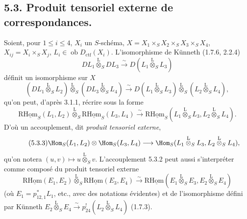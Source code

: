 \subsection*{5.3. Produit tensoriel externe de correspondances.}

Soient, pour $1\leq i\leq 4$, $X_i$ un $S$-schéma, $X=X_1\times_SX_2\times_SX_3\times_SX_4$, $X_{ij}=X_i\times_SX_j$, $L_i\in\operatorname{ob}D_{\mathrm{ctf}}(X_i)$. L'isomorphisme de Künneth (1.7.6, 2.2.4)
\[
DL_1\overset{\mathrm{L}}{\otimes}_SDL_3\xrightarrow{\sim}D(L_1\overset{\mathrm{L}}{\otimes}_SL_3)
\]
définit un isomorphisme sur $X$
\begin{equation}
\tag{5.3.1}
(DL_1\overset{\mathrm{L}}{\otimes}_SL_2)\overset{\mathrm{L}}{\otimes}_S(DL_3\overset{\mathrm{L}}{\otimes}_SL_4)
\xrightarrow{\sim}D(L_1\overset{\mathrm{L}}{\otimes}_SL_3)\overset{\mathrm{L}}{\otimes}_S(L_2\overset{\mathrm{L}}{\otimes}_SL_4),
\end{equation}
qu'on peut, d'après 3.1.1, récrire sous la forme
\begin{equation}
\tag{5.3.2}
\mathrm{R}\underline{\mathrm{Hom}}_S(L_1,L_2)\overset{\mathrm{L}}{\otimes}_S\mathrm{R}\underline{\mathrm{Hom}}_S(L_3,L_4)
\xrightarrow{\sim}\mathrm{R}\underline{\mathrm{Hom}}_S(L_1\overset{\mathrm{L}}{\otimes}_SL_3,L_2\overset{\mathrm{L}}{\otimes}_SL_4).
\end{equation}
D'où un accouplement, dit \emph{produit tensoriel externe},
\begin{equation}
\tag{5.3.3}
\Hom_S(L_1,L_2)\otimes\Hom_S(L_3,L_4)
\longrightarrow\Hom_S(L_1\overset{\mathrm{L}}{\otimes}_SL_3,L_2\overset{\mathrm{L}}{\otimes}_SL_4),
\end{equation}
qu'on notera $(u,v)\mapsto u\overset{\mathrm{L}}{\otimes}_Sv$. L'accouplement 5.3.2 peut aussi s'interpréter comme composé du produit tensoriel externe
\[
\mathrm{R}\underline{\mathrm{Hom}}(E_1,E_2)\overset{\mathrm{L}}{\otimes}_S\mathrm{R}\underline{\mathrm{Hom}}(E_3,E_4)
\xrightarrow{\sim}\mathrm{R}\underline{\mathrm{Hom}}(E_1\overset{\mathrm{L}}{\otimes}_SE_3,E_2\overset{\mathrm{L}}{\otimes}_SE_4)
\]
(où $E_1=p_{12,1}^*L_1$, etc., avec des notations évidentes) et de l'isomorphisme défini par Künneth $E_2\overset{\mathrm{L}}{\otimes}_SE_4\xrightarrow{\sim}p_{24}^!(L_2\overset{\mathrm{L}}{\otimes}_SL_4)$ (1.7.3).

